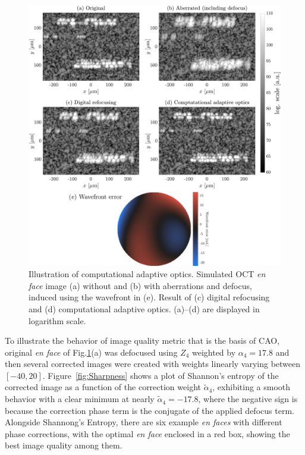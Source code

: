\begin{figure}[htb!]
	\centering
	\includegraphics[width=\textwidth]{Figures/TheoreticalBasis/CAO.pdf}
	\caption[Illustration of computational adaptive optics.]{Illustration of computational adaptive optics. Simulated OCT \textit{en face} image (a) without and (b) with aberrations and defocus, induced using the wavefront in (e). Result of (c) digital refocusing and (d) computational adaptive optics. (a)--(d) are displayed in logarithm scale.}
	\label{fig:CAO}
\end{figure}

To illustrate the behavior of image quality metric that is the basis of CAO, original \textit{en face} of Fig.\ref{fig:CAO}(a) was defocused using $Z_4$ weighted by $\alpha_4=17.8$ and then several corrected images were created with weights linearly varying between $[-40, 20]$. Figure~\ref{fig:Sharpness} shows a plot of Shannon's entropy of the corrected image as a function of the correction weight $\tilde{\alpha}_4$, exhibiting a smooth behavior with a clear minimum at nearly $\tilde{\alpha}_4=-17.8$, where the negative sign is because the correction phase term is the conjugate of the applied defocus term. Alongside Shannong's Entropy, there are six example \textit{en faces} with different phase corrections, with the optimal \textit{en face} enclosed in a red box, showing the best image quality among them.

